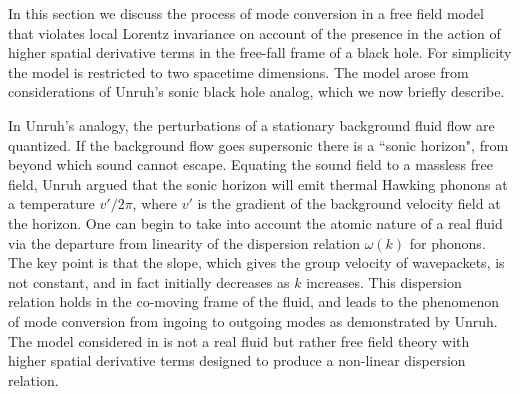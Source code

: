 In this section we discuss the process of mode conversion in a free
field model that violates local Lorentz invariance on account of the
presence in the action of higher spatial derivative terms in the
free-fall frame of a black hole. For simplicity the model is restricted
to two spacetime dimensions. The model arose from considerations of
Unruh's sonic black hole analog\cite{Unruh1}, which we now briefly
describe.

In Unruh's analogy, the perturbations of a stationary background fluid
flow are quantized. If the background flow goes supersonic there is a
``sonic horizon", from beyond which sound cannot escape. Equating the
sound field to a massless free field, Unruh argued that the sonic
horizon will emit thermal Hawking phonons at a temperature $v'/2\pi$,
where $v'$ is the gradient of the background velocity field at the
horizon. One can begin to take into account the atomic nature of a real
fluid via the departure from linearity of the dispersion relation
$\omega(k)$ for phonons\cite{Jaco1}.  The key point is that the slope,
which gives the group velocity of wavepackets, is not constant, and in
fact initially decreases as $k$ increases. This dispersion relation
holds in the co-moving frame of the fluid, and leads to the phenomenon
of mode conversion from ingoing to outgoing modes as demonstrated by
Unruh\cite{Unruh2}. The model considered in \cite{Unruh2} is not a real
fluid but rather free field theory with higher spatial derivative terms
designed to produce a non-linear dispersion relation.

